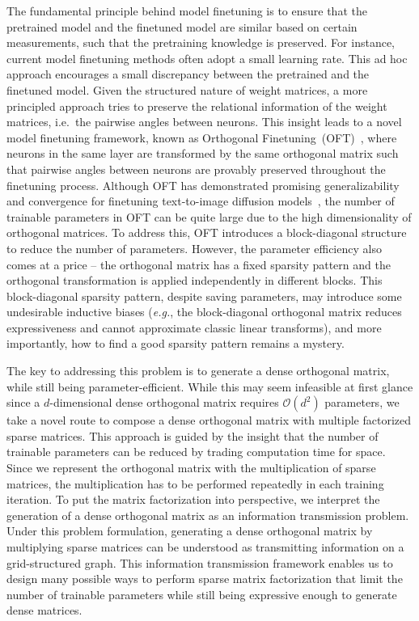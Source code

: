 \documentclass{article} %
\newcommand{\eg}{\emph{e.g.}}
\begin{document}
The fundamental principle behind model finetuning is to ensure that the pretrained model and the finetuned model are similar based on certain measurements, such that the pretraining knowledge is preserved. For instance, current model finetuning methods often adopt a small learning rate. This ad hoc approach encourages a small discrepancy between the pretrained and the finetuned model. Given the structured nature of weight matrices, a more principled approach  tries to preserve the relational information of the weight matrices, i.e.~the pairwise angles between neurons. This insight leads to a novel model finetuning framework, known as Orthogonal Finetuning~(OFT)~\cite{qiu2023controlling}, where neurons in the same layer are transformed by the same orthogonal matrix such that pairwise angles between neurons are provably preserved throughout the finetuning process. Although OFT has demonstrated promising generalizability and convergence for finetuning text-to-image diffusion models~\cite{qiu2023controlling}, the number of trainable parameters in OFT can be quite large due to the high dimensionality of orthogonal matrices. To address this, OFT introduces a block-diagonal structure to reduce the number of parameters. However, the parameter efficiency also comes at a price -- the orthogonal matrix has a fixed sparsity pattern and the orthogonal transformation is applied independently in different blocks. This block-diagonal sparsity pattern, despite saving parameters, may introduce some undesirable inductive biases (\eg, the block-diagonal orthogonal matrix reduces expressiveness and cannot approximate classic linear transforms), and more importantly, how to find a good sparsity pattern remains a mystery.

\vspace{-0.6mm}

The key to addressing this problem is to generate a dense orthogonal matrix, while still being parameter-efficient. While this may seem infeasible at first glance since a $d$-dimensional dense orthogonal matrix requires $\mathcal{O}(d^2)$ parameters, we take a novel route to compose a dense orthogonal matrix with multiple factorized sparse matrices. This approach is guided by the insight that the number of trainable parameters can be reduced by trading computation time for space. Since we represent the orthogonal matrix with the multiplication of sparse matrices, the multiplication has to be performed repeatedly in each training iteration. To put the matrix factorization into perspective, we interpret the generation of a dense orthogonal matrix as an information transmission problem. Under this problem formulation, generating a dense orthogonal matrix by multiplying sparse matrices can be understood as transmitting information on a grid-structured graph. This information transmission framework enables us to design many possible ways to perform sparse matrix factorization that limit the number of trainable parameters while still being expressive enough to generate dense matrices.
\end{document}
